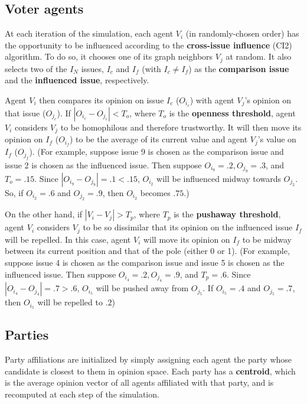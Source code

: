 \subsection{Voter agents}

At each iteration of the simulation, each agent $V_i$ (in randomly-chosen
order) has the opportunity to be influenced according to the
\textbf{cross-issue influence} (CI2) algorithm\cite{davies_agent-based_2023}.
To do so, it chooses one of its graph neighbors $V_j$ at random. It also
selects two of the $I_N$ issues, $I_c$ and $I_f$ (with $I_c \neq I_f$) as the
\textbf{comparison issue} and the \textbf{influenced issue}, respectively.

Agent $V_i$ then compares its opinion on issue $I_c$ ($O_{i_c}$) with agent
$V_j$'s opinion on that issue ($O_{j_c}$). If $|O_{i_c} - O_{j_c}| < T_o$,
where $T_o$ is the \textbf{openness threshold}, agent $V_i$ considers $V_j$ to
be homophilous and therefore trustworthy. It will then move its opinion on
$I_f$ ($O_{i_f}$) to be the average of its current value and agent $V_j$'s
value on $I_f$ ($O_{j_f}$). (For example, suppose issue 9 is chosen as the
comparison issue and issue 2 is chosen as the influenced issue. Then suppose
$O_{i_9} = .2, O_{j_9} = .3$, and $T_o = .15$. Since $|O_{i_9} - O_{j_9}| = .1
< .15$, $O_{i_2}$ will be influenced midway towards $O_{j_2}$. So, if $O_{i_2} = .6$ and $O_{j_2} = .9$, then $O_{i_2}$ becomes $.75$.)

On the other hand, if $|V_i - V_j| > T_p$, where $T_p$ is the \textbf{pushaway
threshold}, agent $V_i$ considers $V_j$ to be so dissimilar that its opinion on
the influenced issue $I_f$ will be repelled. In this case, agent $V_i$ will
move its opinion on $I_f$ to be midway between its current position and that of
the pole (either 0 or 1). (For example, suppose issue 4 is chosen as the
comparison issue and issue 5 is chosen as the influenced issue. Then suppose
$O_{i_4} = .2, O_{j_4} = .9$, and $T_p = .6$. Since $|O_{i_4} - O_{j_4}| = .7
> .6$, $O_{i_5}$ will be pushed away from $O_{j_5}$. If $O_{i_5} = .4$ and $O_{j_5} = .7$, then $O_{i_5}$ will be repelled to $.2$)

\subsection{Parties}

Party affiliations are initialized by simply assigning each agent the party
whose candidate is closest to them in opinion space. Each party has a
\textbf{centroid}, which is the average opinion vector of all agents
affiliated with that party, and is recomputed at each step of the simulation.

